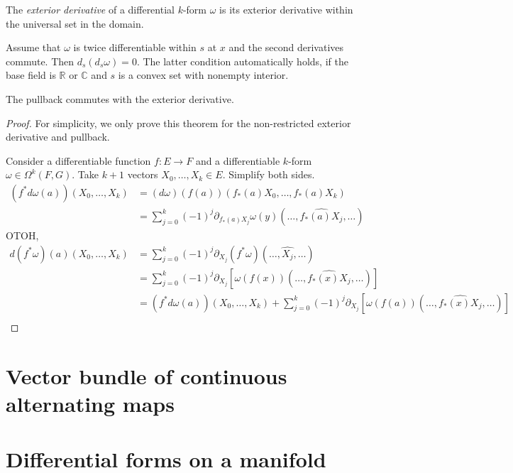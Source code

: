 \begin{definition}%
  \label{def:ederiv}
  The \emph{exterior derivative} of a differential \(k\)-form \(\omega\)
  is its exterior derivative within the universal set in the domain.
\end{definition}

\begin{theorem}%
  \label{def:ederivWithin-sq}
  Assume that \(\omega\) is twice differentiable within \(s\) at \(x\)
  and the second derivatives commute. Then \(d_{s}(d_{s}\omega) = 0\).
  The latter condition automatically holds, if the base field is
  \(\mathbb R\) or \(\mathbb C\) and \(s\) is a convex set with
  nonempty interior.
\end{theorem}

\begin{theorem}%
  \label{thm:pullback-ederiv-within}
  \notready%
  The pullback commutes with the exterior derivative.
\end{theorem}

\begin{proof}
  For simplicity, we only prove this theorem
  for the non-restricted exterior derivative and pullback.

  Consider a differentiable function \(f\colon E \to F\)
  and a differentiable \(k\)-form \(\omega\in \Omega^{k}(F, G)\).
  Take \(k+1\) vectors \(X_{0}, \dots, X_{k}\in E\).
  Simplify both sides.
  \begin{align*}
    (f^{*}d\omega(a))(X_{0}, \dots, X_{k})
    &=(d\omega)(f(a))(f_{*}(a)X_{0}, \dots, f_{*}(a)X_{k})\\
    &=\sum_{j=0}^{k}{(-1)}^{j}\partial_{f_{*}(a)X_{j}}\omega(y)(\dots, \widehat{f_{*}(a)X_{j}}, \dots)
  \end{align*}
  OTOH,
  \begin{align*}
    d(f^{*}\omega)(a)(X_{0}, \dots, X_{k})
    &=\sum_{j=0}^{k}{(-1)}^{j}\partial_{X_{j}}(f^{*}\omega)(\dots, \widehat{X_{j}}, \dots)\\
    &=\sum_{j=0}^{k}{(-1)}^{j}\partial_{X_{j}}\left[\omega(f(x))(\dots, \widehat{f_{*}(x)X_{j}}, \dots)\right]\\
    &=(f^{*}d\omega(a))(X_{0}, \dots, X_{k}) + \sum_{j=0}^{k}{(-1)}^{j}\partial_{X_{j}}\left[\omega(f(a))(\dots, \widehat{f_{*}(x)X_{j}}, \dots)\right]\\
  \end{align*}
\end{proof}
\chapter{Vector bundle of continuous alternating maps}%
\label{cha:vect-bundle-cont}

\chapter{Differential forms on a manifold}%
\label{cha:diff-forms-manif}

